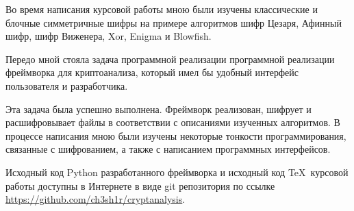 Во время написания курсовой работы мною были изучены классические
и блочные симметричные шифры на примере алгоритмов
шифр Цезаря, Афинный шифр, шифр Виженера, Xor, 
Enigma и Blowfish.

Передо мной стояла задача программной реализации программной 
реализации фреймворка для криптоанализа,
который имел бы удобный интерфейс пользователя и разработчика.

Эта задача была успешно выполнена. Фреймворк реализован, 
шифрует и расшифровывает файлы в соответствии с описаниями
изученных алгоритмов. В процессе написания мною были изучены некоторые 
тонкости программирования, связанные с шифрованием, а также с 
написанием программных интерфейсов.

Исходный код Python разработанного фреймворка и исходный 
код \TeX~курсовой работы доступны в Интернете в виде git 
репозитория по ссылке
\url{https://github.com/ch3sh1r/cryptanalysis}.
